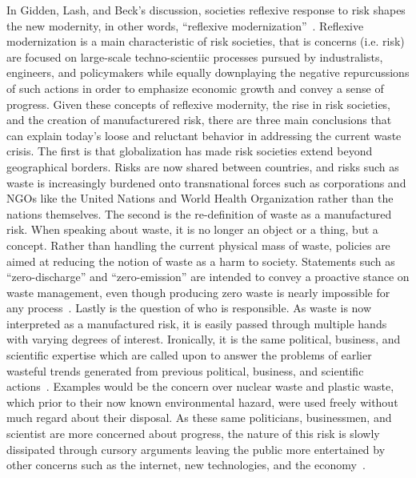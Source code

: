 \documentclass[../main/main]{subfiles}
\begin{document}
In Gidden, Lash, and Beck's discussion, societies reflexive response to risk shapes the new modernity, in other words, ``reflexive modernization''~\cite{beck1992,beck1994}. Reflexive modernization is a main characteristic of risk societies, that is concerns (i.e. risk) are focused on large-scale techno-scientiic processes pursued by industralists, engineers, and policymakers while equally downplaying the negative repurcussions of such actions in order to emphasize economic growth and convey a sense of progress. Given these concepts of reflexive modernity, the rise in risk societies, and the creation of manufacturered risk, there are three main conclusions that can explain today's loose and reluctant behavior in addressing the current waste crisis. The first is that globalization has made risk societies extend beyond geographical borders. Risks are now shared between countries, and risks such as waste is increasingly burdened onto transnational forces such as corporations and NGOs like the United Nations and World Health Organization rather than the nations themselves. The second is the re-definition of waste as a manufactured risk. When speaking about waste, it is no longer an object or a thing, but a concept. Rather than handling the current physical mass of waste, policies are aimed at reducing the notion of waste as a harm to society. Statements such as ``zero-discharge'' and ``zero-emission'' are intended to convey a proactive stance on waste management, even though producing zero waste is nearly impossible for any process~\cite{wang2004}. Lastly is the question of who is responsible. As waste is now interpreted as a manufactured risk, it is easily passed through multiple hands with varying degrees of interest. Ironically, it is the same political, business, and scientific expertise which are called upon to answer the problems of earlier wasteful trends generated from previous political, business, and scientific actions~\cite{beck1992}. Examples would be the concern over nuclear waste and plastic waste, which prior to their now known environmental hazard, were used freely without much regard about their disposal. As these same politicians, businessmen, and scientist are more concerned about progress, the nature of this risk is slowly dissipated through cursory arguments leaving the public more entertained by other concerns such as the internet, new technologies, and the economy~\cite{andrews2018}.

\end{document}
